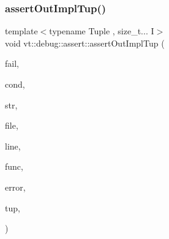 \mbox{\label{namespacevt_1_1debug_1_1assert_ab6abd4cf4f3c08bc228bb426ed920bce}} 
\subsubsection{\texorpdfstring{assert\+Out\+Impl\+Tup()}{assertOutImplTup()}}
{\footnotesize\ttfamily template$<$typename Tuple , size\+\_\+t... I$>$ \\
void vt\+::debug\+::assert\+::assert\+Out\+Impl\+Tup (\begin{DoxyParamCaption}\item[{bool}]{fail,  }\item[{std\+::string const}]{cond,  }\item[{std\+::string const \&}]{str,  }\item[{std\+::string const \&}]{file,  }\item[{int const}]{line,  }\item[{std\+::string const \&}]{func,  }\item[{\hyperlink{namespacevt_a793764d753923abc3d32929870beb485}{Error\+Code\+Type}}]{error,  }\item[{Tuple \&\&}]{tup,  }\item[{std\+::index\+\_\+sequence$<$ I... $>$}]{ }\end{DoxyParamCaption})\hspace{0.3cm}{\ttfamily [inline]}}

\mbox{\label{namespacevt_1_1debug_1_1assert_a91f318f3df8ee377f4f25aba03fe4f26}} 

